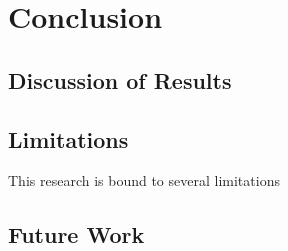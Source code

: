 \chapter{Conclusion}
\section{Discussion of Results}
\section{Limitations}
This research is bound to several limitations
\section{Future Work}

\begin{comment}
- zusammenführen der artefakte in RAPADO
- recursive snarks -->auf den ersten Teil der EInleitung beziehen
\end{comment}